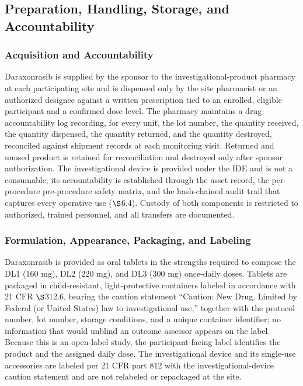 \subsection{Preparation, Handling, Storage, and Accountability}

\subsubsection{Acquisition and Accountability}

Daraxonrasib is supplied by the sponsor to the investigational-product pharmacy at
each participating site and is dispensed only by the site pharmacist or an
authorized designee against a written prescription tied to an enrolled, eligible
participant and a confirmed dose level. The pharmacy maintains a drug-accountability
log recording, for every unit, the lot number, the quantity received, the quantity
dispensed, the quantity returned, and the quantity destroyed, reconciled against
shipment records at each monitoring visit. Returned and unused product is retained
for reconciliation and destroyed only after sponsor authorization. The
investigational device is provided under the IDE and is not a consumable; its
accountability is established through the asset record, the per-procedure
pre-procedure safety matrix, and the hash-chained audit trail that captures every
operative use ($\S$6.4). Custody of both components is restricted to authorized,
trained personnel, and all transfers are documented.

\subsubsection{Formulation, Appearance, Packaging, and Labeling}

Daraxonrasib is provided as oral tablets in the strengths required to compose the
DL1 (160 mg), DL2 (220 mg), and DL3 (300 mg) once-daily doses. Tablets are packaged
in child-resistant, light-protective containers labeled in accordance with 21 CFR
$\S$312.6, bearing the caution statement ``Caution: New Drug. Limited by Federal
(or United States) law to investigational use,'' together with the protocol number,
lot number, storage conditions, and a unique container identifier; no information
that would unblind an outcome assessor appears on the label. Because this is an
open-label study, the participant-facing label identifies the product and the
assigned daily dose. The investigational device and its single-use accessories are
labeled per 21 CFR part 812 with the investigational-device caution statement and
are not relabeled or repackaged at the site.

